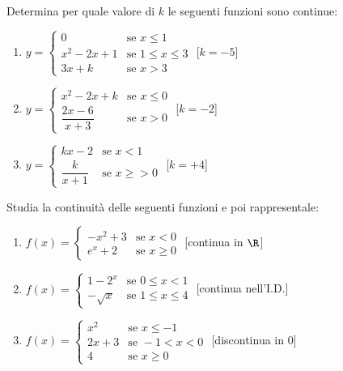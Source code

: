 \begin{esercizio}\label{ese:03.1}
Determina per quale valore di \(k\) le seguenti funzioni sono continue:
 \begin{enumerate} [label=\alph*]
  \item 
  \(y=\begin{cases} 
    0 & \mbox{se } x \leqslant 1 \\ 
    x^2-2x+1 & \mbox{se } 1 \leqslant x \leqslant 3 \\ 
    3x+k & \mbox{se } x > 3
  \end{cases}\)
  \hfill [\(k=-5\)]
  \item 
  \(y=\begin{cases} 
    x^2-2x+k & \mbox{se } x \leqslant 0 \\ 
    \dfrac{2x-6}{x+3} & \mbox{se } x > 0
  \end{cases}\)
  \hfill [\(k=-2\)]
  \item 
  \(y=\begin{cases} 
    kx-2 & \mbox{se } x < 1 \\ 
    \dfrac{k}{x+1} & \mbox{se } x \geqslant> 0
  \end{cases}\)
  \hfill [\(k=+4\)]
 \end{enumerate}
\end{esercizio}

\begin{esercizio}\label{ese:03.1}
Studia la continuità delle seguenti funzioni e poi rappresentale:
 \begin{enumerate} [label=\alph*]
  \item 
  \(f(x)=\begin{cases} 
    -x^2+3 & \mbox{se } x < 0 \\ 
    e^x+2 & \mbox{se } x \geqslant 0
  \end{cases}\)
  \hfill [continua in \(\R\)]
  \item 
  \(f(x)=\begin{cases} 
    1-2^x & \mbox{se } 0 \leqslant x < 1 \\ 
    -\sqrt{x} & \mbox{se } 1 \leqslant x \leqslant 4
  \end{cases}\)
  \hfill [continua nell'I.D.]
  \item 
  \(f(x)=\begin{cases} 
    x^2 & \mbox{se } x \leqslant -1 \\ 
    2x+3 & \mbox{se } -1 < x < 0 \\
    4 & \mbox{se } x \geqslant 0
  \end{cases}\)
  \hfill [discontinua in 0]
 \end{enumerate}
\end{esercizio}


